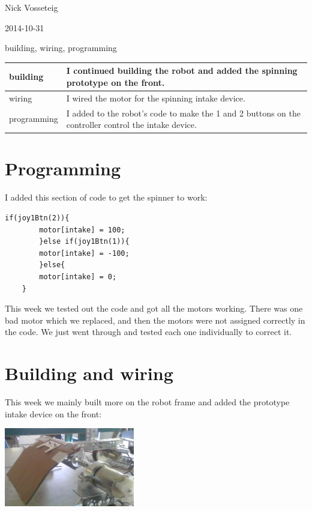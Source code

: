 Nick Vosseteig

2014-10-31

building, wiring, programming

\begin{tabular}{|p{5cm}|p{5cm}|}
 \hline
 building&
I continued building the robot and added the spinning prototype on the front.
 \\
 \hline
wiring&
I wired the motor for the spinning intake device.
 \\
 \hline
programming&
I added to the robot's code to make the 1 and 2 buttons on the controller control the intake device.
 \\
 \hline
\end{tabular}

\section*{Programming}
I added this section of code to get the spinner to work:
\begin{lstlisting}[style = RobotC]	
	if(joy1Btn(2)){
		motor[intake] = 100;
		}else if(joy1Btn(1)){
		motor[intake] = -100;
		}else{
		motor[intake] = 0;
	}
\end{lstlisting}
This week we tested out the code and got all the  motors working. There was one bad motor which we replaced, and then the motors were not assigned correctly in the code. We just went through and tested each one individually to correct it.

\section*{Building and wiring}
This week we mainly built more on the robot frame and added the prototype intake device on the front:

\begin{center}
 \includegraphics[width=215px]{./Entries/Images/intake_device2.jpg}
\end{center}